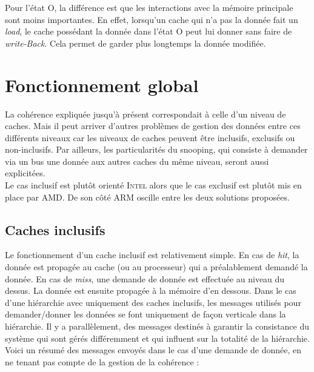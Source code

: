 Pour l'état O, la différence est que les interactions avec la mémoire principale sont moins importantes. En effet, lorsqu'un cache qui n'a pas la donnée fait un \textit{load}, le cache possédant la donnée dans l'état O peut lui donner sans faire de \textit{write-Back}. Cela permet de garder plus longtemps la donnée modifiée.

\newpage
\section{Fonctionnement global}
La cohérence expliquée jusqu'à présent correspondait à celle d'un niveau de caches. Mais il peut arriver d'autres problèmes de gestion des données entre ces différents niveaux car les niveaux de caches peuvent être inclusifs, exclusifs ou non-inclusifs. Par ailleurs, les particularités du snooping, qui consiste à demander via un bus une donnée aux autres caches du même niveau, seront aussi explicitées. \\

Le cas inclusif est plutôt orienté \textsc{Intel} alors que le cas exclusif est plutôt mis en place par \textsc{AMD}. De son côté \textsc{ARM} oscille entre les deux solutions proposées.

\subsection{Caches inclusifs}
Le fonctionnement d'un cache inclusif est relativement simple. En cas de \textit{hit}, la donnée est propagée au cache (ou au processeur) qui a préalablement demandé la donnée. En cas de \textit{miss}, une demande de donnée est effectuée au niveau du dessus. La donnée est ensuite propagée à la mémoire d'en dessous. Dans le cas d'une hiérarchie avec uniquement des caches inclusifs, les messages utilisés pour demander/donner les données se font uniquement de façon verticale dans la hiérarchie. Il y a parallèlement, des messages destinés à garantir la consistance du système qui sont gérés différemment et qui influent sur la totalité de la hiérarchie. Voici un résumé des messages envoyés dans le cas d'une demande de donnée, en ne tenant pas compte de la gestion de la cohérence : \\

